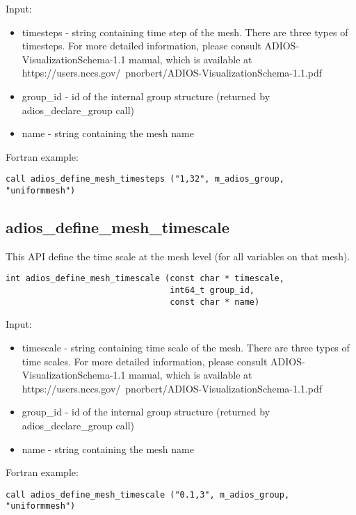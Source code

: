 Input:
\begin{itemize}
\item timesteps - string containing time step of the mesh. There are three types of
timesteps. For more detailed information, please consult ADIOS-VisualizationSchema-1.1 manual,
which is available at https://users.nccs.gov/~pnorbert/ADIOS-VisualizationSchema-1.1.pdf
\item group\_id - id of the internal group structure (returned by adios\_declare\_group call)
\item name - string containing the mesh name
\end{itemize}

Fortran example:
\begin{lstlisting}[alsolanguage=Fortran,caption={},label={}]
call adios_define_mesh_timesteps ("1,32", m_adios_group, "uniformmesh")
\end{lstlisting}


\subsection{adios\_define\_mesh\_timescale}
This API define the time scale at the mesh level (for all variables on that mesh).

\begin{lstlisting}[alsolanguage=C,caption={},label={}]
int adios_define_mesh_timescale (const char * timescale, 
                                 int64_t group_id, 
                                 const char * name)
\end{lstlisting}

Input:
\begin{itemize}
\item timescale - string containing time scale of the mesh. There are three types of
time scales. For more detailed information, please consult ADIOS-VisualizationSchema-1.1 manual,
which is available at https://users.nccs.gov/~pnorbert/ADIOS-VisualizationSchema-1.1.pdf
\item group\_id - id of the internal group structure (returned by adios\_declare\_group call)
\item name - string containing the mesh name
\end{itemize}

Fortran example:
\begin{lstlisting}[alsolanguage=Fortran,caption={},label={}]
call adios_define_mesh_timescale ("0.1,3", m_adios_group, "uniformmesh")
\end{lstlisting}


